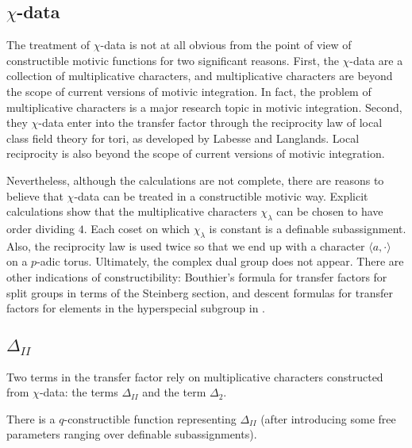 \subsection{$\chi$-data}



The treatment of $\chi$-data is not at all obvious from the point of view of constructible motivic functions for two significant reasons.
First, the $\chi$-data are a collection of multiplicative characters, and multiplicative characters are beyond the scope of current versions of motivic integration.
In fact, the problem of multiplicative characters is a major research topic in motivic integration.
Second, they $\chi$-data enter into the transfer factor through the reciprocity law of local class field theory for tori, as developed by Labesse and Langlands.
Local reciprocity is also beyond the scope of current versions of motivic integration.

Nevertheless, although the calculations are not complete, there are reasons to believe that $\chi$-data can be treated in a constructible motivic way.
Explicit calculations show that the multiplicative characters $\chi_\lambda$ can be chosen to have order dividing $4$.  Each coset on which $\chi_\lambda$ is
constant is a definable subassignment.  Also, the reciprocity law is used twice so that we end up with a character $\langle a,\cdot\rangle$ on a $p$-adic torus.
Ultimately, the complex dual group does not appear.  
There are other indications of constructibility: Bouthier's formula for transfer factors for split groups in terms of the Steinberg section, 
and descent formulas for transfer factors for elements in the hyperspecial subgroup in \cite{hales1993simple}.

\subsection{$\Delta_{II}$}
Two terms in the transfer factor rely on multiplicative characters constructed from $\chi$-data: the terms $\Delta_{II}$ and the term $\Delta_2$.

\begin{lemma}  There is a $q$-constructible function representing $\Delta_{II}$ (after introducing some free parameters ranging over definable subassignments).
\end{lemma}

